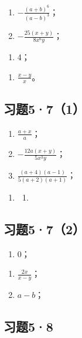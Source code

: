 \begin{enumerate}[start=7]
\item
  \(-\frac{(a + b)^6}{(a - b)^3}\)；
\item
  \(-\frac{25(x + y)}{8x^6y}\)；
\end{enumerate}

\begin{enumerate}[start=9]
\item
  4；
\end{enumerate}

\begin{enumerate}[start=10]
\item
  \(\frac{x - y}{x}\)。
\end{enumerate}

\subsection{习题5·7（1）}

\begin{enumerate}[start=7]
\item
  \(\frac{a + x}{a}\)；
\item
  \(-\frac{12a(x + y)}{5x^3y}\)；
\item
  \(\frac{(a + 4)(a - 1)}{5(a + 2)(a + 1)}\)；
\end{enumerate}

\begin{enumerate}[start=10]
\item
  \begin{enumerate}
  \item
  \end{enumerate}
\end{enumerate}

\subsection{习题5·7（2）}

\begin{enumerate}[start=6]
\item
  0；
\end{enumerate}

\begin{enumerate}[start=7]
\item
  \(\frac{2x}{x - y}\)；
\item
  \(a - b\)；
\end{enumerate}

\subsection{习题5·8}

